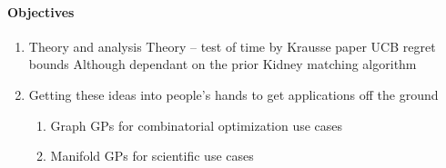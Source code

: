 \paragraph{Objectives}
\begin{enumerate}
    \item Theory and analysis
        Theory -- test of time by Krausse paper UCB
        regret bounds
        Although dependant on the prior 
        Kidney matching algorithm
    \item Getting these ideas into people's hands to get applications off the ground
    \begin{enumerate}
        \item Graph GPs for combinatorial optimization use cases
        \item Manifold GPs for scientific use cases
    \end{enumerate}
\end{enumerate}



